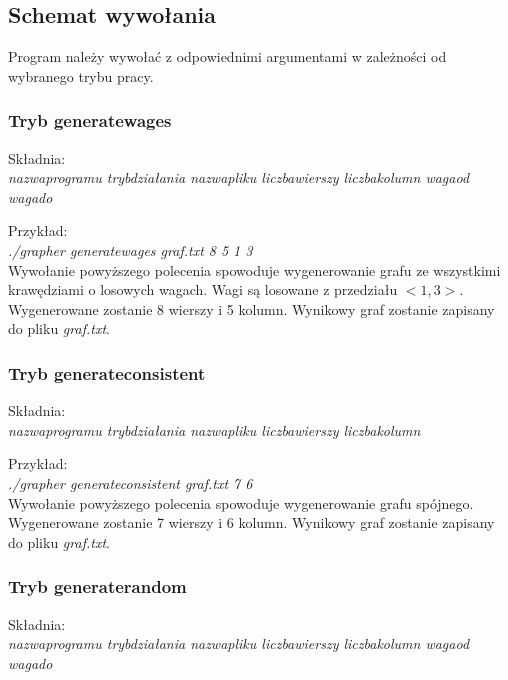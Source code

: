 \documentclass{article}
\begin{document}
\newpage

\subsection{Schemat wywołania}
Program należy wywołać z odpowiednimi argumentami w zależności od wybranego trybu pracy.

\subsubsection{Tryb generate\textunderscore wages}
Składnia:\\
\textit{nazwa\textunderscore programu tryb\textunderscore działania nazwa\textunderscore pliku liczba\textunderscore wierszy liczba\textunderscore kolumn waga\textunderscore od waga\textunderscore do}

\medskip

\noindent Przykład:\\
\textit{./grapher generate\textunderscore wages graf.txt 8 5 1 3}\\
Wywołanie powyższego polecenia spowoduje wygenerowanie grafu ze wszystkimi krawędziami o losowych wagach. Wagi są losowane z przedziału $<1, 3>$. Wygenerowane zostanie 8 wierszy i 5 kolumn. Wynikowy graf zostanie zapisany do pliku \emph{graf.txt}.

\subsubsection{Tryb generate\textunderscore consistent}
Składnia:\\
\textit{nazwa\textunderscore programu tryb\textunderscore działania nazwa\textunderscore pliku liczba\textunderscore wierszy liczba\textunderscore kolumn}

\medskip

\noindent Przykład:\\
\textit{./grapher generate\textunderscore consistent graf.txt 7 6}\\
Wywołanie powyższego polecenia spowoduje wygenerowanie grafu spójnego. Wygenerowane zostanie 7 wierszy i 6 kolumn. Wynikowy graf zostanie zapisany do pliku \emph{graf.txt}.

\subsubsection{Tryb generate\textunderscore random}
Składnia:\\
\textit{nazwa\textunderscore programu tryb\textunderscore działania nazwa\textunderscore pliku liczba\textunderscore wierszy liczba\textunderscore kolumn waga\textunderscore od waga\textunderscore do}
\end{document}
